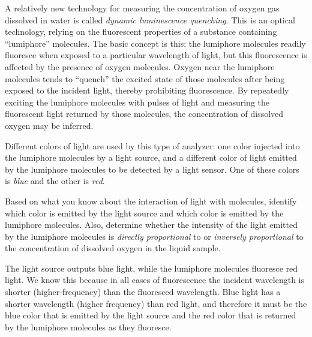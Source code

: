 

A relatively new technology for measuring the concentration of oxygen gas dissolved in water is called {\it dynamic luminescence quenching}.  This is an optical technology, relying on the fluorescent properties of a substance containing ``lumiphore'' molecules.  The basic concept is this: the lumiphore molecules readily fluoresce when exposed to a particular wavelength of light, but this fluorescence is affected by the presence of oxygen molecules.  Oxygen near the lumiphore molecules tends to ``quench'' the excited state of those molecules after being exposed to the incident light, thereby prohibiting fluorescence.  By repeatedly exciting the lumiphore molecules with pulses of light and measuring the fluorescent light returned by those molecules, the concentration of dissolved oxygen may be inferred.

\vskip 10pt

Different colors of light are used by this type of analyzer: one color injected into the lumiphore molecules by a light source, and a different color of light emitted by the lumiphore molecules to be detected by a light sensor.  One of these colors is {\it blue} and the other is {\it red}.

\vskip 10pt

Based on what you know about the interaction of light with molecules, identify which color is emitted by the light source and which color is emitted by the lumiphore molecules.  Also, determine whether the intensity of the light emitted by the lumiphore molecules is {\it directly proportional} to or {\it inversely proportional} to the concentration of dissolved oxygen in the liquid sample.







The light source outputs blue light, while the lumiphore molecules fluoresce red light.  We know this because in all cases of fluorescence the incident wavelength is shorter (higher-frequency) than the fluoresced wavelength.  Blue light has a shorter wavelength (higher frequency) than red light, and therefore it must be the blue color that is emitted by the light source and the red color that is returned by the lumiphore molecules as they fluoresce.

